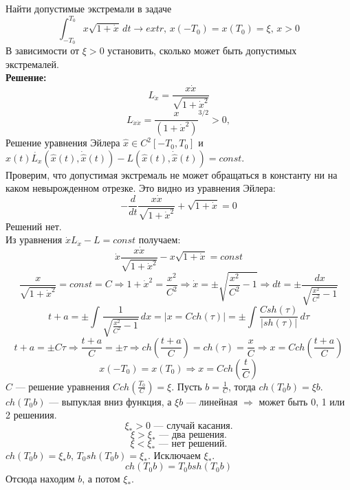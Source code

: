 \begin{task} \label{task6}
    Найти допустимые экстремали в задаче
    \[  \int_{-T_{0}}^{T_{0}} x\sqrt{1 + \dot{x}} \,dt \rightarrow extr\text{, }x(-T_{0}) = x(T_{0}) = \xi\text{, } x > 0 \]
    В зависимости от $\xi > 0$ установить, сколько может быть допустимых экстремалей. \\
    \textbf{Решение:} \\
    \[L_{\dot{x}} = \frac{x\dot{x}}{\sqrt{1 + \dot{x}^2}}\]
    \[L_{\dot{x}\dot{x}} = {\frac{x}{(1 + \dot{x}^{2})}^ {3/2}} > 0,\]
    Решение уравнения Эйлера $\hat{x} \in C^2[-T_{0}, T_{0}]$ и $\hat{x}(t)\dot{L_{x}}(\hat{x}(t),
        \dot{\hat{x}}(t)) - L(\hat{x}(t),
        \dot{\hat{x}}(t)) = const$.\\
    Проверим, что допустимая экстремаль не может обращаться в константу ни на каком невырожденном отрезке. Это видно из уравнения Эйлера:
    \[-\frac{d}{dt} \frac{x\dot{x}}{\sqrt{1 + \dot{x}^2}} + \sqrt{1 + \dot{x}} = 0\]
    Решений нет. \\
    Из уравнения $\dot{x}L_{\dot{x}} - L = const$ получаем: \\
    \[ \dot{x} \frac{x\dot{x}}{\sqrt{1 + \dot{x}^2}} - x\sqrt{1 + \dot{x}} = const\]
    \[\frac{x}{\sqrt{1 + \dot{x}^2}} = const = C \Rightarrow 1 + \dot{x}^2 = \frac{x^2}{C^2} \Rightarrow \dot{x} = \pm \sqrt{\frac{x^2}{C^2} - 1} \Rightarrow dt = \pm \frac{dx}{\sqrt{\frac{x^2}{C^2} - 1}}\]
    \[t + a = \pm \int_{}^{}\frac{1}{\sqrt{\frac{x^2}{C^2} - 1}} \,dx = \left| x = Cch(\tau) \right| = \pm \int_{}^{}\frac{C sh(\tau)}{|sh(\tau)|} \,d\tau \]
    \[t + a = \pm C\tau \Rightarrow \frac{t+a}{C} = \pm \tau \Rightarrow ch\left(\frac{t+a}{C}\right) = ch(\tau) = \frac{x}{C} \Rightarrow x = Cch\left(\frac{t+a}{C}\right)\]
    \[x(-T_{0}) = x(T_{0}) \Rightarrow x = Cch\left(\frac{t}{C}\right)\]
    $C$ --- решение уравнения $Cch\left(\frac{T_{0}}{C}\right) = \xi$. Пусть $b = \frac{1}{C}$, тогда $ch(T_{0}b) = \xi b$. $ch(T_{0}b)$ --- выпуклая вниз функция, а $\xi b$ --- линейная $\Rightarrow$ может быть 0, 1 или 2 решениия.
    \[\xi_{*} > 0 \text{ --- случай касания.}\]
    \[\xi > \xi_{*} \text{ --- два решения.}\]
    \[\xi < \xi_{*} \text{ --- нет решений.}\]
    $ch(T_{0}b) = \xi_{*}b$, $T_{0}sh(T_{0}b) = \xi_{*}$. Исключаем $\xi_{*}$.
    \[ch(T_{0}b) = T_{0}bsh(T_{0}b)\]
    Отсюда находим $b$, а потом $\xi_{*}$.
\end{task}